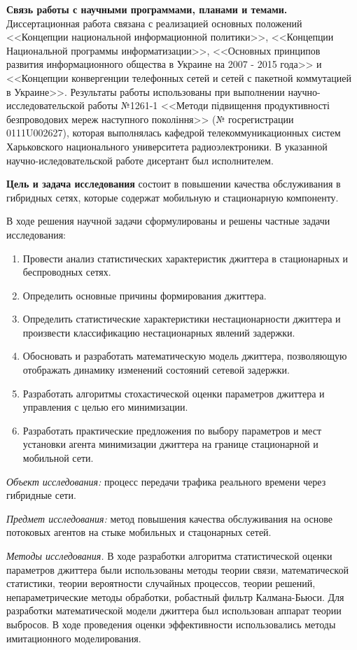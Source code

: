 \textbf{Связь работы с научными программами, планами и темами.} Диссертационная работа связана с реализацией основных положений <<Концепции национальной информационной политики>>, <<Концепции Национальной программы информатизации>>, <<Основных принципов развития информационного общества в Украине на 2007 - 2015 года>> и <<Концепции конвергенции телефонных сетей и сетей с пакетной коммутацией в Украине>>.
Результаты работы использованы при выполнении научно-исследовательской работы №1261-1 <<Методи підвищення продуктивності безпроводових мереж наступного покоління>> (№ госрегистрации 0111U002627), которая выполнялась кафедрой телекоммуникационных систем Харьковского национального университета радиоэлектроники. В указанной научно-иследовательской работе дисертант был исполнителем.

\textbf{Цель и задача исследования} состоит в повышении качества обслуживания в гибридных сетях, которые содержат мобильную и стационарную компоненту.

В ходе решения научной задачи сформулированы и решены частные задачи исследования:
\begin{enumerate}
  \item Провести анализ статистических характеристик джиттера в стационарных и беспроводных сетях.
  \item Определить основные причины формирования джиттера.
  \item Определить статистические характеристики нестационарности джиттера и произвести классификацию нестационарных явлений задержки.
  \item Обосновать и разработать математическую модель джиттера, позволяющую отображать динамику изменений состояний сетевой задержки.
  \item Разработать алгоритмы стохастической оценки параметров джиттера и управления с целью его минимизации.
  \item Разработать практические предложения по выбору параметров и мест установки агента минимизации джиттера на границе стационарной и мобильной сети.
\end{enumerate}

{\itshape Объект исследования:} процесс передачи трафика реального времени через гибридные сети.

{\itshape Предмет исследования:} метод повышения качества обслуживания на основе потоковых агентов на стыке мобильных и стацонарных сетей.

{\itshape Методы исследования.} 
В ходе разработки алгоритма статистической оценки параметров джиттера были использованы методы теории связи, математической статистики, теории вероятности случайных процессов, 
теории решений, непараметрические методы обработки, робастный фильтр Калмана-Бьюси. 
Для разработки математической модели джиттера был использован аппарат теории выбросов. 
В ходе проведения оценки эффективности использовались методы имитационного моделирования.


